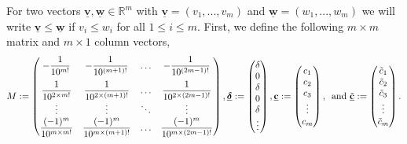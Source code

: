 \documentclass[12pt]{article}
\begin{document}
For two vectors $\mathbf{\underline{v}},\mathbf{\underline{w}} \in \mathbb{R}^m$ with $\mathbf{\underline{v}}= (v_1,...,v_m)$ and $\mathbf{\underline{w}}= (w_1,...,w_m)$ we will write $\mathbf{\underline{v}} \leq \mathbf{\underline{w}}$ if $v_i \leq w_i$ for all $1 \leq i \leq m$. First, we define the following $m \times m$ matrix and $m \times 1$ column vectors,
\[ M:=\begin{pmatrix} 
    -\dfrac{1}{10^{m!}} & - \dfrac{1}{10^{(m+1)!}} & \hdots & -\dfrac{1}{10^{(2m-1)!}} \\[1em]
    \dfrac{1}{10^{2\times m!}}& \dfrac{1}{10^{2 \times(m+1)!}} &  \hdots & \dfrac{1}{10^{2 \times (2m-1)!}} \\
    \vdots & \vdots & \ddots & \vdots \\
    \dfrac{(-1)^m}{10^{m \times m!}} & \dfrac{(-1)^m}{10^{m \times (m+1)!}} & \hdots & \dfrac{(-1)^m}{10^{m \times (2m-1)!}} 
    \end{pmatrix}, \underline{\text{\boldmath$\delta$}}:=
    \begin{pmatrix}
        \delta \\
        0 \\
        \delta \\
        0 \\
        \delta \\
        \vdots \\
    \end{pmatrix},
\underline{\mathbf{c}}:=\begin{pmatrix}
        c_1 \\
        c_2\\
        c_3 \\
        \vdots \\
        c_m \\
    \end{pmatrix},
    \hspace{5pt}
    \text{and } \underline{\Tilde{\mathbf{c}}}:=
    \begin{pmatrix}
        \Tilde{c}_1 \\
        \Tilde{c}_2\\
        \Tilde{c}_3 \\
        \vdots \\
        \Tilde{c}_m \\
    \end{pmatrix}.
    \] 
\end{document}
